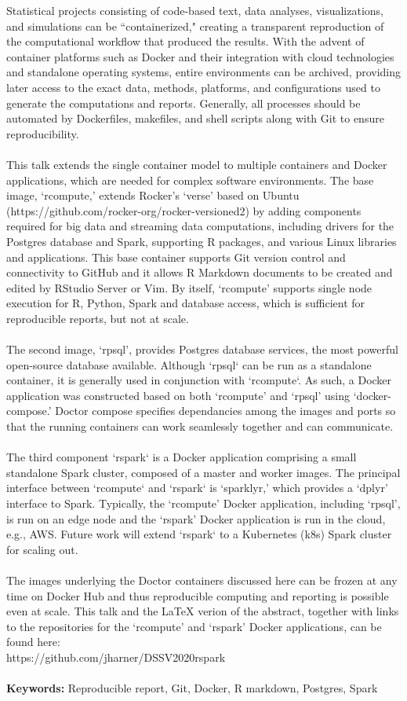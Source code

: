 Statistical projects consisting of code-based text, data analyses, visualizations, and simulations can be ``containerized," creating a transparent reproduction of the computational workflow that produced the results. With the advent of container platforms such as Docker and their integration with cloud technologies and standalone operating systems, entire environments can be archived, providing later access to the exact data, methods, platforms, and configurations used to generate the computations and reports. Generally, all processes should be automated by Dockerfiles, makefiles, and shell scripts along with Git to ensure reproducibility.\\
\\
This talk extends the single container model to multiple containers and Docker applications, which are needed for complex software environments. The base image, `rcompute,' extends Rocker's `verse' based on Ubuntu (https://github.com/rocker-org/rocker-versioned2) by adding components required for big data and streaming data computations, including drivers for the Postgres database and Spark, supporting R packages, and various Linux libraries and applications. This base container supports Git version control and connectivity to GitHub and it allows R Markdown documents to be created and edited by RStudio Server or Vim. By itself, `rcompute' supports single node execution for R, Python, Spark and database access, which is sufficient for reproducible reports, but not at scale.\\
\\
The second image, `rpsql', provides Postgres database services, the most powerful open-source database available. Although `rpsql` can be run as a standalone container, it is generally used in conjunction with `rcompute`. As such, a Docker application was constructed based on both `rcompute' and `rpsql' using `docker-compose.' Doctor compose specifies dependancies among the images and ports so that the running containers can work seamlessly together and can communicate.\\
\\
The third component `rspark` is a Docker application comprising a small standalone Spark cluster, composed of a master and worker images. The principal interface between `rcompute` and `rspark` is `sparklyr,' which provides a `dplyr' interface to Spark. Typically, the `rcompute' Docker application, including `rpsql', is run on an edge node and the `rspark' Docker application is run in the cloud, e.g., AWS. Future work will extend `rspark` to a Kubernetes (k8s) Spark cluster for scaling out.\\
\\
The images underlying the Doctor containers discussed here can be frozen at any time on Docker Hub and thus reproducible computing and reporting is possible even at scale. This talk and the LaTeX verion of the abstract, together with links to the repositories for the `rcompute' and `rspark' Docker applications, can be found here:\\ https://github.com/jharner/DSSV2020rspark\\
\\
\textbf{Keywords:} Reproducible report, Git, Docker, R markdown, Postgres, Spark


